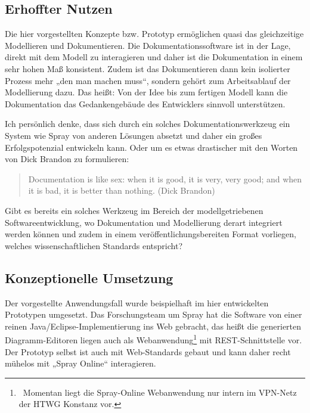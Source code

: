  
\subsection{Erhoffter Nutzen}\label{}
 
Die hier vorgestellten Konzepte bzw. Prototyp ermöglichen quasi das gleichzeitige Modellieren und Dokumentieren. Die Dokumentationssoftware ist in der Lage, direkt mit dem Modell zu interagieren und daher ist die Dokumentation in einem sehr hohen Maß konsistent. Zudem ist das Dokumentieren dann kein isolierter Prozess mehr „den man machen muss“, sondern gehört zum Arbeitsablauf der Modellierung dazu. Das heißt: Von der Idee bis zum fertigen Modell kann die Dokumentation das Gedankengebäude des Entwicklers sinnvoll unterstützen.

 
Ich persönlich denke, dass sich durch ein solches Dokumentationswerkzeug ein System wie Spray von anderen Lösungen absetzt und daher ein großes Erfolgspotenzial entwickeln kann. Oder um es etwas drastischer mit den Worten von Dick Brandon zu formulieren:

 
\begin{quote}
 Documentation is like sex: when it is good, it is very, very good; and when it is bad, it is better than nothing. (Dick Brandon)
\end{quote}
 
Gibt es bereits ein solches Werkzeug im Bereich der modellgetriebenen Softwareentwicklung, wo Dokumentation und Modellierung derart integriert werden können und zudem in einem veröffentlichungsbereiten Format vorliegen, welches wissenschaftlichen Standards entspricht?

 
\subsection{Konzeptionelle Umsetzung}\label{}
 
Der vorgestellte Anwendungsfall wurde beispielhaft im hier entwickelten Prototypen umgesetzt. Das Forschungsteam um Spray hat die Software von einer reinen Java/Eclipse-Implementierung ins Web gebracht, das heißt die generierten Diagramm-Editoren liegen auch als Webanwendung\footnote{~Momentan liegt die Spray-Online Webanwendung nur intern im VPN-Netz der HTWG Konstanz vor.} mit REST-Schnittstelle vor. Der Prototyp selbst ist auch mit Web-Standards gebaut und kann daher recht mühelos mit „Spray Online“ interagieren.

